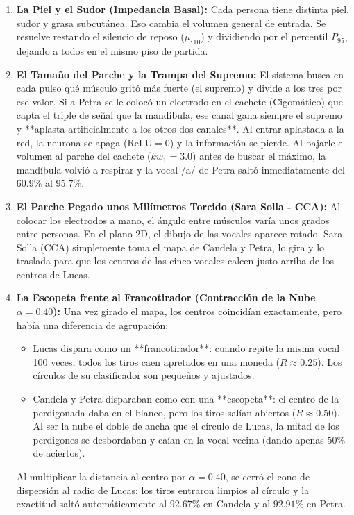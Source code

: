 \documentclass[11pt,a4paper,openany]{book}
\theoremstyle{definition}
\begin{document}
\begin{enumerate}
    \item \textbf{La Piel y el Sudor (Impedancia Basal):} Cada persona tiene distinta piel, sudor y grasa subcutánea. Eso cambia el volumen general de entrada. Se resuelve restando el silencio de reposo ($\mu_{:10}$) y dividiendo por el percentil $P_{95}$, dejando a todos en el mismo piso de partida.
    \item \textbf{El Tamaño del Parche y la Trampa del Supremo:} El sistema busca en cada pulso qué músculo gritó más fuerte (el supremo) y divide a los tres por ese valor. Si a Petra se le colocó un electrodo en el cachete (Cigomático) que capta el triple de señal que la mandíbula, ese canal gana siempre el supremo y **aplasta artificialmente a los otros dos canales**. Al entrar aplastada a la red, la neurona se apaga ($\text{ReLU} = 0$) y la información se pierde. Al bajarle el volumen al parche del cachete ($kw_1 = 3.0$) antes de buscar el máximo, la mandíbula volvió a respirar y la vocal /a/ de Petra saltó inmediatamente del $60.9\%$ al $\mathbf{95.7\%}$.
    \item \textbf{El Parche Pegado unos Milímetros Torcido (Sara Solla - CCA):} Al colocar los electrodos a mano, el ángulo entre músculos varía unos grados entre personas. En el plano 2D, el dibujo de las vocales aparece rotado. Sara Solla (CCA) simplemente toma el mapa de Candela y Petra, lo gira y lo traslada para que los centros de las cinco vocales calcen justo arriba de los centros de Lucas.
    \item \textbf{La Escopeta frente al Francotirador (Contracción de la Nube $\alpha = 0.40$):} Una vez girado el mapa, los centros coincidían exactamente, pero había una diferencia de agrupación:
    \begin{itemize}
        \item Lucas dispara como un **francotirador**: cuando repite la misma vocal 100 veces, todos los tiros caen apretados en una moneda ($R \approx 0.25$). Los círculos de su clasificador son pequeños y ajustados.
        \item Candela y Petra disparaban como con una **escopeta**: el centro de la perdigonada daba en el blanco, pero los tiros salían abiertos ($R \approx 0.50$). Al ser la nube el doble de ancha que el círculo de Lucas, la mitad de los perdigones se desbordaban y caían en la vocal vecina (dando apenas $50\%$ de aciertos).
    \end{itemize}
    Al multiplicar la distancia al centro por $\alpha = 0.40$, se cerró el cono de dispersión al radio de Lucas: los tiros entraron limpios al círculo y la exactitud saltó automáticamente al $\mathbf{92.67\%}$ en Candela y al $\mathbf{92.91\%}$ en Petra.
\end{enumerate}
\end{document}
